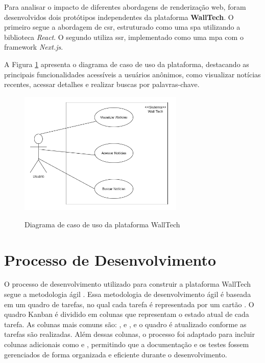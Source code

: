 Para analisar o impacto de diferentes abordagens de renderização web, foram desenvolvidos dois protótipos independentes da plataforma \textbf{WallTech}. O primeiro segue a abordagem de \acrfull{csr}, estruturado como uma \acrfull{spa} utilizando a biblioteca \textit{React}. O segundo utiliza \acrfull{ssr}, implementado como uma \acrfull{mpa} com o framework \textit{Next.js}.

A Figura \ref{fig:caso-uso-walltech} apresenta o diagrama de caso de uso da plataforma, destacando as principais funcionalidades acessíveis a usuários anônimos, como visualizar notícias recentes, acessar detalhes e realizar buscas por palavras-chave.

\begin{figure}[H]
  \centering
  \caption{Diagrama de caso de uso da plataforma WallTech}
  \includegraphics[width=0.7\textwidth]{media/wall_tech_use_case.png}
  \label{fig:caso-uso-walltech}
\end{figure}


\section{Processo de Desenvolvimento}
\label{section:processo-desenvolvimento}
O processo de desenvolvimento utilizado para construir a plataforma WallTech segue a metodologia ágil . Essa metodologia de desenvolvimento ágil é baseada em um quadro de tarefas, no qual cada tarefa é representada por um cartão \cite{gomes2014kanban}. O quadro Kanban é dividido em colunas que representam o estado atual de cada tarefa. As colunas mais comuns são: ,  e , e o quadro é atualizado conforme as tarefas são realizadas. Além dessas colunas, o processo foi adaptado para incluir colunas adicionais como  e , permitindo que a documentação e os testes fossem gerenciados de forma organizada e eficiente durante o desenvolvimento.

